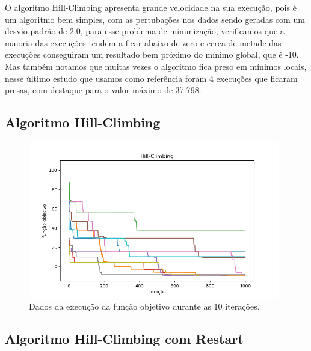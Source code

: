 O algoritmo Hill-Climbing apresenta grande velocidade na sua execução, pois é um algoritmo bem simples, com as pertubações nos dados sendo geradas com um desvio padrão de 2.0, para esse problema de minimização, verificamos que a maioria das execuções tendem a ficar abaixo de zero e cerca de metade das execuções conseguiram um resultado bem próximo do mínimo global, que é -10. Mas também notamos que muitas vezes o algoritmo fica preso em mínimos locais, nesse último estudo que usamos como referência foram 4 execuções que ficaram presas, com destaque para o valor máximo de 37.798.

\subsection{Algoritmo Hill-Climbing}

\begin{figure}[H]
\centering
\includegraphics[width=110mm]{imagens/otima/problema-1-hill-climbing-funcao-objetivo-best.png}
\caption{Dados da execução da função objetivo durante as 10 iterações.
\label{fig:problema-1-hill-climbing-funcao-objetivo}}
\end{figure}

\subsection{Algoritmo Hill-Climbing com Restart}

